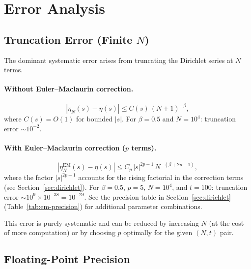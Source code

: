 \section{Error Analysis}
\label{sec:errors}

\subsection{Truncation Error (Finite $N$)}
\label{sec:trunc}

The dominant systematic error arises from truncating the Dirichlet series at $N$ terms.

\paragraph{Without Euler--Maclaurin correction.}
\begin{equation}\label{eq:trunc-no-em}
  |\eta_N(s) - \eta(s)| \le C(s)\,(N{+}1)^{-\beta},
\end{equation}
where $C(s) = O(1)$ for bounded $|s|$. For $\beta = 0.5$ and $N = 10^4$: truncation
error $\sim 10^{-2}$.

\paragraph{With Euler--Maclaurin correction ($p$ terms).}
\begin{equation}\label{eq:trunc-em}
  |\eta_N^{\mathrm{EM}}(s) - \eta(s)|
  \le C_p\,|s|^{2p-1}\,N^{-(\beta + 2p - 1)},
\end{equation}
where the factor $|s|^{2p-1}$ accounts for the rising factorial in the correction terms
(see Section~\ref{sec:dirichlet}). For $\beta = 0.5$, $p = 5$, $N = 10^4$, and
$t = 100$: truncation error $\sim 10^{9} \times 10^{-38} = 10^{-29}$. See the precision
table in Section~\ref{sec:dirichlet} (Table~\ref{tab:em-precision}) for additional
parameter combinations.

This error is purely systematic and can be reduced by increasing $N$ (at the cost of
more computation) or by choosing $p$ optimally for the given $(N, t)$ pair.


\subsection{Floating-Point Precision}
\label{sec:trig}


